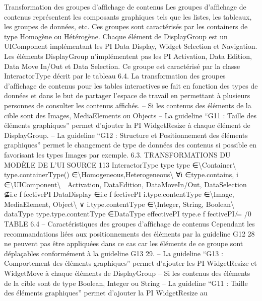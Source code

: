 \documentclass{article}
\begin{document}
Transformation des groupes d’afﬁchage de contenus
Les groupes d’afﬁchage de contenus repr\'{e}sentent les composants graphiques tels que les listes,
les tableaux, les groupes de donn\'{e}es, etc. Ces groupes sont caract\'{e}ris\'{e}s par les containers de type
Homog\`{e}ne ou H\'{e}t\'{e}rog\`{e}ne. Chaque \'{e}l\'{e}ment de DisplayGroup est un UIComponent impl\'{e}mentant les
PI Data Display, Widget Selection et Navigation. Les \'{e}l\'{e}ments DisplayGroup n’impl\'{e}mentent pas les
PI Activation, Data Edition, Data Move In/Out et Data Selection. Ce groupe est caract\'{e}ris\'{e} par la
classe InteractorType d\'{e}crit par le tableau 6.4.
La transformation des groupes d’afﬁchage de contenus pour les tables interactives se fait en fonction des types de donn\'{e}es et dans le but de partager l’espace de travail en permettant \`{a} plusieurs
personnes de consulter les contenus afﬁch\'{e}s.
– Si les contenus des \'{e}l\'{e}ments de la cible sont des Images, MediaElements ou Objects
– La guideline “G11 : Taille des \'{e}l\'{e}ments graphiques” permet d’ajouter la PI WidgetResize \`{a}
chaque \'{e}l\'{e}ment de DisplayGroup.
– La guideline “G12 : Structure et Positionnement des \'{e}l\'{e}ments graphiques” permet le changement de type de donn\'{e}es des contenus si possible en favorisant les types Images par exemple.
6.3. TRANSFORMATIONS DU MODÈLE DE L’UI SOURCE
113
InteractorType
type
type ∈\textbackslash{}{Container\textbackslash{}}
type.containerType() ∈\textbackslash{}{Homogeneous,Heterogeneous\textbackslash{}}
∀i ∈type.contains, i ∈\textbackslash{}{UIComponent\textbackslash{}}

Activation, DataEdition,
DataMoveIn/Out, DataSelection

⊈i.e f fectivePI
DataDisplay ∈i.e f fectivePI
i.type.contentType ∈\textbackslash{}{Image, MediaElement, Object\textbackslash{}}
∨
i.type.contentType ∈\textbackslash{}{Integer, String, Boolean\textbackslash{}}
dataType
type.type.contentType ∈DataType
effectivePI
type.e f fectivePI ̸= /0
TABLE 6.4 – Caract\'{e}ristiques des groupes d’afﬁchage de contenus
Cependant les recommandations li\'{e}es aux positionnements des \'{e}l\'{e}ments par la guideline
G12 28 ne peuvent pas \^{e}tre appliqu\'{e}es dans ce cas car les \'{e}l\'{e}ments de ce groupe sont d\'{e}pla\c{c}ables conform\'{e}ment \`{a} la guideline G13 29.
– La guideline “G13 : Comportement des \'{e}l\'{e}ments graphiques” permet d’ajouter les PI WidgetResize et WidgetMove \`{a} chaque \'{e}l\'{e}ments de DisplayGroup
– Si les contenus des \'{e}l\'{e}ments de la cible sont de type Boolean, Integer ou String
– La guideline “G11 : Taille des \'{e}l\'{e}ments graphiques” permet d’ajouter la PI WidgetResize au
\end{document}
